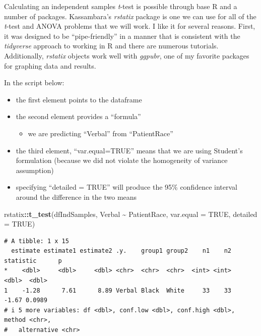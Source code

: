 \documentclass[
  11pt,
]{book}
\newenvironment{Shaded}{\begin{snugshade}}{\end{snugshade}}
\newcommand{\AttributeTok}[1]{\textcolor[rgb]{0.27,0.27,0.27}{#1}}
\newcommand{\ConstantTok}[1]{\textcolor[rgb]{0.37,0.37,0.37}{#1}}
\newcommand{\FunctionTok}[1]{\textcolor[rgb]{0.27,0.27,0.27}{\textbf{#1}}}
\newcommand{\NormalTok}[1]{#1}
\newcommand{\SpecialCharTok}[1]{\textcolor[rgb]{0.43,0.43,0.43}{\textbf{#1}}}
\providecommand{\tightlist}{%
  \setlength{\itemsep}{0pt}\setlength{\parskip}{0pt}}
\begin{document}
Calculating an independent samples \emph{t}-test is possible through base R and a number of packages. Kassambara's \citeyearpar{kassambara_pipe-friendly_nodate} \emph{rstatix} package is one we can use for all of the \emph{t}-test and ANOVA problems that we will work. I like it for several reasons. First, it was designed to be ``pipe-friendly'' in a manner that is consistent with the \emph{tidyverse} approach to working in R and there are numerous tutorials. Additionally, \emph{rstatix} objects work well with \emph{ggpubr}, one of my favorite packages for graphing data and results.

In the script below:

\begin{itemize}
\tightlist
\item
  the first element points to the dataframe
\item
  the second element provides a ``formula''

  \begin{itemize}
  \tightlist
  \item
    we are predicting ``Verbal'' from ``PatientRace''
  \end{itemize}
\item
  the third element, ``var.equal=TRUE'' means that we are using Student's formulation (because we did not violate the homogeneity of variance assumption)
\item
  specifying ``detailed = TRUE'' will produce the 95\% confidence interval around the difference in the two means
\end{itemize}

\begin{Shaded}
\begin{Highlighting}[]
\NormalTok{rstatix}\SpecialCharTok{::}\FunctionTok{t\_test}\NormalTok{(dfIndSamples, Verbal }\SpecialCharTok{\textasciitilde{}}\NormalTok{ PatientRace, }\AttributeTok{var.equal =} \ConstantTok{TRUE}\NormalTok{, }\AttributeTok{detailed =} \ConstantTok{TRUE}\NormalTok{)}
\end{Highlighting}
\end{Shaded}

\begin{verbatim}
# A tibble: 1 x 15
  estimate estimate1 estimate2 .y.    group1 group2    n1    n2 statistic      p
*    <dbl>     <dbl>     <dbl> <chr>  <chr>  <chr>  <int> <int>     <dbl>  <dbl>
1    -1.28      7.61      8.89 Verbal Black  White     33    33     -1.67 0.0989
# i 5 more variables: df <dbl>, conf.low <dbl>, conf.high <dbl>, method <chr>,
#   alternative <chr>
\end{verbatim}
\end{document}
